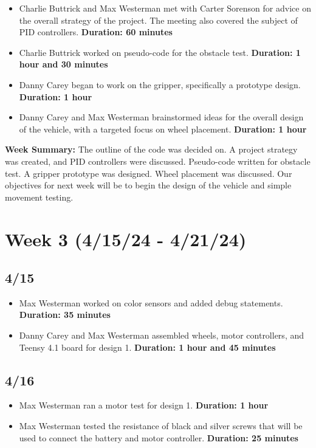 \documentclass[12pt]{report}
\begin{document}
\begin{itemize}
    \item Charlie Buttrick and Max Westerman met with Carter Sorenson for advice on the overall strategy of the project. The meeting also covered the subject of \gls{PID} controllers. \textbf{Duration: 60 minutes}
    \item Charlie Buttrick worked on pseudo-code for the obstacle test. \textbf{Duration: 1 hour and 30 minutes}
    \item Danny Carey began to work on the gripper, specifically a prototype design. \textbf{Duration: 1 hour}
    \item Danny Carey and Max Westerman brainstormed ideas for the overall design of the vehicle, with a targeted focus on wheel placement. \textbf{Duration: 1 hour}
\end{itemize}

\textbf{Week Summary:} The outline of the code was decided on. A project strategy was created, and \gls{PID} controllers were discussed. Pseudo-code written for obstacle test. A gripper prototype was designed. Wheel placement was discussed. Our objectives for next week will be to begin the design of the vehicle and simple movement testing.

\section{Week 3 (4/15/24 - 4/21/24)}
\subsection*{4/15}

\begin{itemize}
    \item Max Westerman worked on color sensors and added debug statements. \textbf{Duration: 35 minutes}
    \item Danny Carey and Max Westerman assembled wheels, motor controllers, and Teensy 4.1 board for design 1. \textbf{Duration: 1 hour and 45 minutes}
\end{itemize}

\subsection*{4/16}

\begin{itemize}
    \item Max Westerman ran a motor test for design 1. \textbf{Duration: 1 hour}
    \item Max Westerman tested the resistance of black and silver screws that will be used to connect the battery and motor controller. \textbf{Duration: 25 minutes}
\end{itemize}
\end{document}
